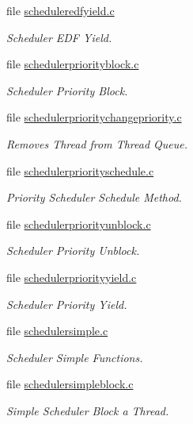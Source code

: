 \begin{DoxyCompactItemize}
file \mbox{\hyperlink{scheduleredfyield_8c}{scheduleredfyield.\+c}}
\begin{DoxyCompactList}\small\item\em Scheduler E\+DF Yield. \end{DoxyCompactList}\item 
file \mbox{\hyperlink{schedulerpriorityblock_8c}{schedulerpriorityblock.\+c}}
\begin{DoxyCompactList}\small\item\em Scheduler Priority Block. \end{DoxyCompactList}\item 
file \mbox{\hyperlink{schedulerprioritychangepriority_8c}{schedulerprioritychangepriority.\+c}}
\begin{DoxyCompactList}\small\item\em Removes Thread from Thread Queue. \end{DoxyCompactList}\item 
file \mbox{\hyperlink{schedulerpriorityschedule_8c}{schedulerpriorityschedule.\+c}}
\begin{DoxyCompactList}\small\item\em Priority Scheduler Schedule Method. \end{DoxyCompactList}\item 
file \mbox{\hyperlink{schedulerpriorityunblock_8c}{schedulerpriorityunblock.\+c}}
\begin{DoxyCompactList}\small\item\em Scheduler Priority Unblock. \end{DoxyCompactList}\item 
file \mbox{\hyperlink{schedulerpriorityyield_8c}{schedulerpriorityyield.\+c}}
\begin{DoxyCompactList}\small\item\em Scheduler Priority Yield. \end{DoxyCompactList}\item 
file \mbox{\hyperlink{schedulersimple_8c}{schedulersimple.\+c}}
\begin{DoxyCompactList}\small\item\em Scheduler Simple Functions. \end{DoxyCompactList}\item 
file \mbox{\hyperlink{schedulersimpleblock_8c}{schedulersimpleblock.\+c}}
\begin{DoxyCompactList}\small\item\em Simple Scheduler Block a Thread. \end{DoxyCompactList}\item 

\end{DoxyCompactItemize}
